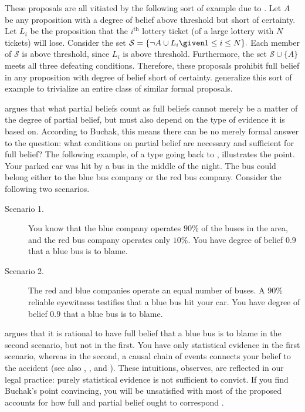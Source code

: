 These proposals are all vitiated by the following sort of example due to
\citet{korb1992collapse}. Let $A$ be any proposition with a degree of belief
above threshold but short of certainty. Let $L_i$ be the proposition that the
$i^\text{th}$ lottery ticket (of a large lottery with $N$ tickets) will lose.
Consider the set $\mathcal{S} = \{ \neg A \cup L_i  \given  1 \leq i \leq N \}.$
Each member of $\mathcal{S}$ is above threshold, since $L_i$ is above threshold.
Furthermore, the set $\mathcal{S} \cup \{ A\}$ meets all three defeating
conditions. Therefore, these proposals prohibit full belief in any proposition
with degree of belief short of certainty. \citet{douven2006generalizing}
generalize this sort of example to trivialize an entire class of similar formal
proposals.

\citet{buchak2014belief} argues that what partial beliefs count as full beliefs
cannot merely be a matter of the degree of partial belief, but must also depend
on the type of evidence it is based on. According to Buchak, this means there
can be no merely formal answer to the question: what conditions on partial
belief are necessary and sufficient for full belief? The following example, of a
type going back to \citet{thomson1986liability}, illustrates the point. Your
parked car was hit by a bus in the middle of the night. The bus could belong
either to the blue bus company or the red bus company. Consider the following
two scenarios.
\begin{description}
\item[Scenario 1.] You know that the blue company operates $90\%$ of the buses
in the area, and the red bus company operates only $10\%$. You have degree of
belief $0.9$  that a blue bus is to blame.
\item[Scenario 2.] The red and blue companies operate an equal number of buses.
A $90\%$ reliable eyewitness testifies that a blue bus hit your car. You have
degree of belief $0.9$ that a blue bus is to blame.
\end{description}
\citet{buchak2014belief} argues that it is rational to have full belief that a
blue bus is to blame in the second scenario, but not in the first. You have only
statistical evidence in the first scenario, whereas in the second, a causal
chain of events connects your belief to the accident (see also
\citealp{thomson1986liability}, \citealp{nelkin2000lottery}, and
\citealp{schauer2003profiles}). These intuitions, \citeauthor{buchak2014belief}
observes, are reflected in our legal practice: purely statistical evidence is
not sufficient to convict. If you find Buchak's point convincing, you will be
unsatisfied with most of the proposed accounts for how full and partial belief
ought to correspond \citep{staffel2016beliefs}. 

